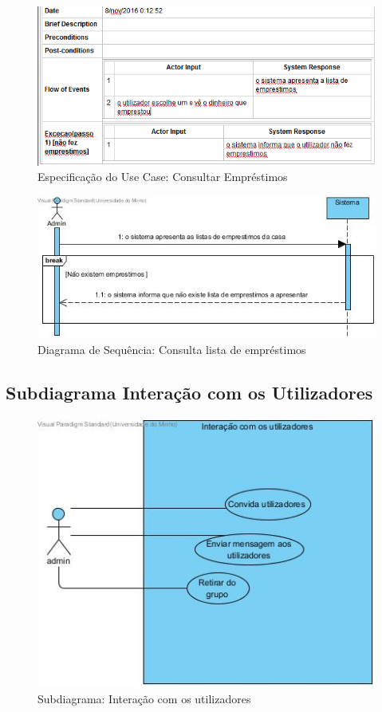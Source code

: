 \begin{figure}[htb!]
	\centering
	\includegraphics[scale=0.7]{imagens/Especificacoes/consultaremprestimos}  
	\caption{Especificação do Use Case: Consultar Empréstimos}  
\end{figure}

\begin{figure}[htb!]
	\centering
	\includegraphics[scale=0.5]{imagens/diagramaSeq/ConsultarListaEmprestimos}  
	\caption{Diagrama de Sequência: Consulta lista de empréstimos}  
\end{figure}



\newpage

\subsection{Subdiagrama Interação com os Utilizadores}
\begin{figure}[htb!]
	\centering
	\includegraphics[scale=0.6]{imagens/UseCase/InteracaoComOsUtilizadores}  
	\caption{Subdiagrama: Interação com os utilizadores }  
\end{figure}


